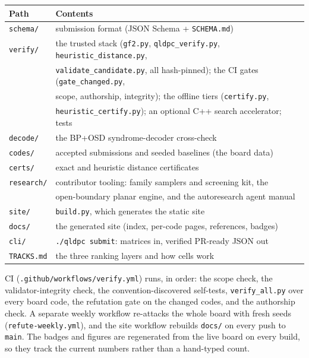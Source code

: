 \documentclass[11pt]{article}
\begin{document}
	\begin{center}
		\begin{tabular}{ll}
			\toprule
			Path & Contents\\
			\midrule
			\texttt{schema/}   & submission format (JSON Schema + \texttt{SCHEMA.md})\\
			\texttt{verify/}   & the trusted stack (\texttt{gf2.py},
			                     \texttt{qldpc\_verify.py},
			                     \texttt{heuristic\_distance.py},\\
			                   & \texttt{validate\_candidate.py}, all
			                     hash-pinned); the CI gates
			                     (\texttt{gate\_changed.py},\\
			                   & scope, authorship, integrity); the offline
			                     tiers (\texttt{certify.py},\\
			                   & \texttt{heuristic\_certify.py}); an optional
			                     C++ search accelerator; tests\\
			\texttt{decode/}   & the BP+OSD syndrome-decoder cross-check\\
			\texttt{codes/}    & accepted submissions and seeded baselines
			                     (the board data)\\
			\texttt{certs/}    & exact and heuristic distance certificates\\
			\texttt{research/} & contributor tooling: family samplers and
			                     screening kit, the\\
			                   & open-boundary planar engine, and the
			                     autoresearch agent manual\\
			\texttt{site/}     & \texttt{build.py}, which generates the static site\\
			\texttt{docs/}     & the generated site (index, per-code pages,
			                     references, badges)\\
			\texttt{cli/}      & \texttt{./qldpc submit}: matrices in,
			                     verified PR-ready JSON out\\
			\texttt{TRACKS.md} & the three ranking layers and how cells work\\
			\bottomrule
		\end{tabular}
	\end{center}
	CI (\texttt{.github/workflows/verify.yml}) runs, in order: the scope
	check, the validator-integrity check, the convention-discovered
	self-tests, \texttt{verify\_all.py} over every board code, the refutation
	gate on the changed codes, and the authorship check. A separate weekly
	workflow re-attacks the whole board with fresh seeds
	(\texttt{refute-weekly.yml}), and the site workflow rebuilds
	\texttt{docs/} on every push to \texttt{main}. The badges and figures are
	regenerated from the live board on every build, so they track the current
	numbers rather than a hand-typed count.
\end{document}

